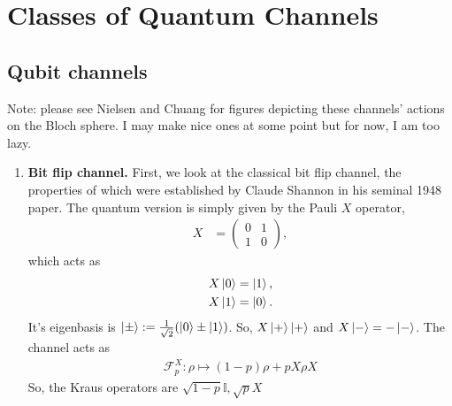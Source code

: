 \documentclass[../../note.tex]{subfiles}
\begin{document}
\chapter{Classes of Quantum Channels}

\section{Qubit channels}
Note: please see Nielsen and Chuang for figures depicting these channels' actions on the Bloch sphere. I may make nice ones at some point but for now, I am too lazy.
\begin{enumerate}
    \item \textbf{Bit flip channel.} First, we look at the classical bit flip channel, the properties of which were established by Claude Shannon in his seminal 1948 paper. The quantum version is simply given by the Pauli $X$
    operator,
    \begin{align}
        X&= \begin{pmatrix}
        0 & 1 \\
        1 & 0
        \end{pmatrix},
    \end{align}
    which acts as
    \begin{align}
        X\ket{0} &= \ket{1},\\
        X\ket{1} &= \ket{0}.
    \end{align}
    It's eigenbasis is $\ket{\pm}:=\frac{1}{\sqrt{2}}(\ket{0}\pm\ket{1})$. So, $X\ket{+} \ket{+}$ and $X\ket{-}=-\ket{-}$. The channel acts as
    \begin{align}
        \mathcal{F}_{p}^X: \rho \mapsto (1-p)\rho + p X\rho X
    \end{align}
    So, the Kraus operators are $\sqrt{1-p} \mathbb{I}, \sqrt{p} X$
    

\end{enumerate}
\end{document}
